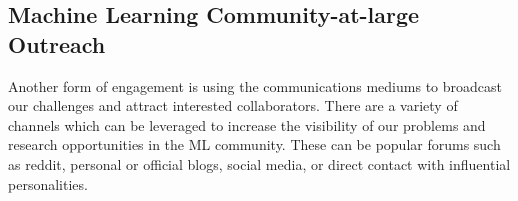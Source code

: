 



\subsection{Machine Learning Community-at-large Outreach}
Another form of engagement is using the communications mediums to broadcast our challenges and attract interested collaborators. There are a variety of channels which can be leveraged to increase the visibility of our problems and research opportunities in the ML community. These can be popular forums such as reddit, personal or official blogs, social media, or direct contact with influential personalities.\\

